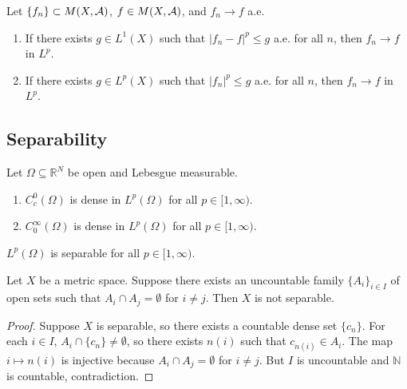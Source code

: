 \begin{remark} 
Let \( \{f_n\} \subset M(X, \mathcal{A}) \), \( f \in M(X, \mathcal{A}) \), and \( f_n \to f \) a.e.
\begin{enumerate}
    \item If there exists \( g \in L^1(X) \) such that \( |f_n - f|^p \leq g \) a.e. for all \( n \), then \( f_n \to f \) in \( L^p \).
    \item If there exists \( g \in L^p(X) \) such that \( |f_n|^p \leq g \) a.e. for all \( n \), then \( f_n \to f \) in \( L^p \).
\end{enumerate}
\end{remark}

\subsection{Separability}

Let \( \Omega \subseteq \mathbb{R}^N \) be open and Lebesgue measurable.

\begin{enumerate}
    \item \( C_c^0(\Omega) \) is dense in \( L^p(\Omega) \) for all \( p \in [1, \infty) \).
    \item \( C_0^\infty(\Omega) \) is dense in \( L^p(\Omega) \) for all \( p \in [1, \infty) \).
\end{enumerate}

\begin{theorem}
\( L^p(\Omega) \) is separable for all \( p \in [1, \infty) \).
\end{theorem}

\clearpage
\begin{lemma}
Let \( X \) be a metric space. Suppose there exists an uncountable family \( \{A_i\}_{i \in I} \) of open sets such that \( A_i \cap A_j = \emptyset \) for \( i \neq j \). Then \( X \) is not separable.
\end{lemma}

\begin{proof}
Suppose \( X \) is separable, so there exists a countable dense set \( \{c_n\} \). For each \( i \in I \), \( A_i \cap \{c_n\} \neq \emptyset \), so there exists \( n(i) \) such that \( c_{n(i)} \in A_i \). The map \( i \mapsto n(i) \) is injective because \( A_i \cap A_j = \emptyset \) for \( i \neq j \). But \( I \) is uncountable and \( \mathbb{N} \) is countable, contradiction.
\end{proof}

